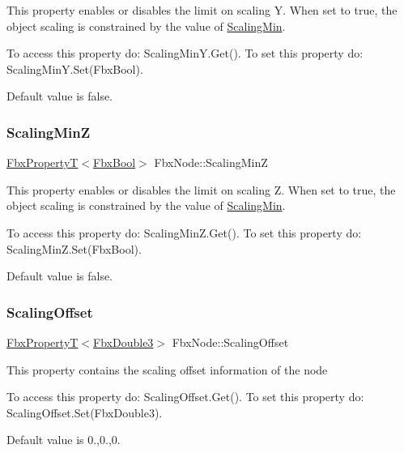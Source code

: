 This property enables or disables the limit on scaling Y. When set to {\ttfamily true}, the object scaling is constrained by the value of \hyperlink{class_fbx_node_a90124619387dc0d2f078d4301cffb4d9}{Scaling\+Min}.

To access this property do\+: Scaling\+Min\+Y.\+Get(). To set this property do\+: Scaling\+Min\+Y.\+Set(\+Fbx\+Bool).

Default value is false. \mbox{\label{class_fbx_node_aba3dd61a9e6d3d553fe0a16e1027ba2b}} 
\subsubsection{\texorpdfstring{Scaling\+MinZ}{ScalingMinZ}}
{\footnotesize\ttfamily \hyperlink{class_fbx_property_t}{Fbx\+PropertyT}$<$\hyperlink{fbxtypes_8h_a92e0562b2fe33e76a242f498b362262e}{Fbx\+Bool}$>$ Fbx\+Node\+::\+Scaling\+MinZ}

This property enables or disables the limit on scaling Z. When set to {\ttfamily true}, the object scaling is constrained by the value of \hyperlink{class_fbx_node_a90124619387dc0d2f078d4301cffb4d9}{Scaling\+Min}.

To access this property do\+: Scaling\+Min\+Z.\+Get(). To set this property do\+: Scaling\+Min\+Z.\+Set(\+Fbx\+Bool).

Default value is false. \mbox{\label{class_fbx_node_a8f1fe91e72b9e34f981b153140cc35de}} 
\subsubsection{\texorpdfstring{Scaling\+Offset}{ScalingOffset}}
{\footnotesize\ttfamily \hyperlink{class_fbx_property_t}{Fbx\+PropertyT}$<$\hyperlink{fbxtypes_8h_ae0a96f14cde566774c7553aa7523b7a7}{Fbx\+Double3}$>$ Fbx\+Node\+::\+Scaling\+Offset}

This property contains the scaling offset information of the node

To access this property do\+: Scaling\+Offset.\+Get(). To set this property do\+: Scaling\+Offset.\+Set(\+Fbx\+Double3).

Default value is 0.,0.,0. \mbox{\label{class_fbx_node_ab7f341494efcbee371d417a9bf19d040}} 
